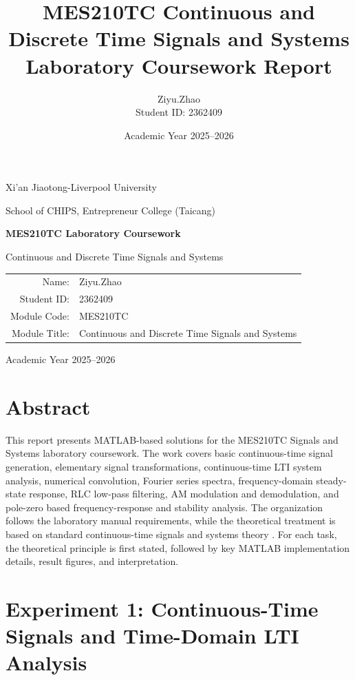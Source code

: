 \documentclass[11pt,a4paper]{article}
\title{\textbf{MES210TC Continuous and Discrete Time Signals and Systems}\\
\large Laboratory Coursework Report}
\author{Ziyu.Zhao\\Student ID: 2362409}
\date{Academic Year 2025--2026}
\begin{document}
\begin{titlepage}
    \centering
    \vspace*{1.0cm}
    {\Large Xi'an Jiaotong-Liverpool University\par}
    \vspace{0.3cm}
    {\large School of CHIPS, Entrepreneur College (Taicang)\par}
    \vspace{1.5cm}
    {\Huge\bfseries MES210TC Laboratory Coursework\par}
    \vspace{0.5cm}
    {\Large Continuous and Discrete Time Signals and Systems\par}
    \vspace{2.0cm}
    \begin{tabular}{rl}
        Name: & Ziyu.Zhao \\
        Student ID: & 2362409 \\
        Module Code: & MES210TC \\
        Module Title: & Continuous and Discrete Time Signals and Systems \\
    \end{tabular}
    \vfill
    {\large Academic Year 2025--2026\par}
    \vspace{0.5cm}
\end{titlepage}

\setcounter{tocdepth}{2}
\tableofcontents
\newpage

\section*{Abstract}
This report presents MATLAB-based solutions for the MES210TC Signals and Systems laboratory coursework. The work covers basic continuous-time signal generation, elementary signal transformations, continuous-time LTI system analysis, numerical convolution, Fourier series spectra, frequency-domain steady-state response, RLC low-pass filtering, AM modulation and demodulation, and pole-zero based frequency-response and stability analysis. The organization follows the laboratory manual requirements, while the theoretical treatment is based on standard continuous-time signals and systems theory \cite{labmanual,oppenheim}. For each task, the theoretical principle is first stated, followed by key MATLAB implementation details, result figures, and interpretation.

\section{Experiment 1: Continuous-Time Signals and Time-Domain LTI Analysis}
\end{document}
